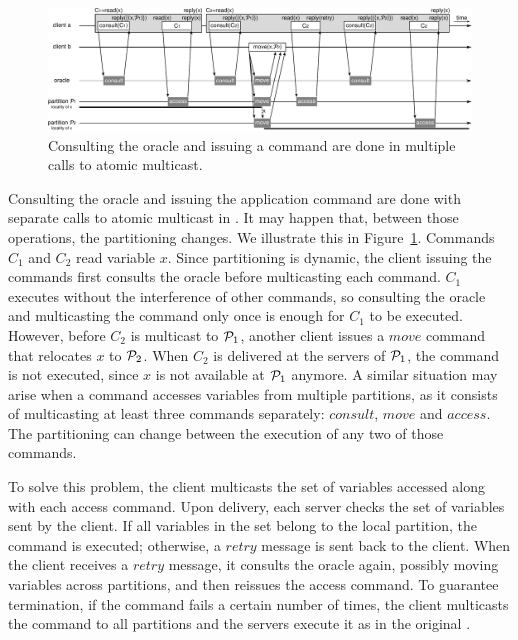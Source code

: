 \begin{figure}
\begin{minipage}[b]{1.0\linewidth}
\centering
      \includegraphics[width=0.8\linewidth]{figures/dssmr-detail}
\end{minipage}
\caption{Consulting the oracle and issuing a command are done in multiple calls to atomic multicast.}
\label{fig:dssmr-detail}
\end{figure}

Consulting the oracle and issuing the application command are done with separate
calls to atomic multicast in \dssmr{}. It may happen that, between those
operations, the partitioning changes. We illustrate this in
Figure~\ref{fig:dssmr-detail}. Commands $C_1$ and $C_2$ read variable $x$. Since
partitioning is dynamic, the client issuing the commands first consults the
oracle before multicasting each command. $C_1$ executes without the interference
of other commands, so consulting the oracle and multicasting the command only
once is enough for $C_1$ to be executed. However, before $C_2$ is multicast to
$\mathcal{P}_1$, another client issues a $move$ command that relocates $x$ to $\mathcal{P}_2$.
When $C_2$ is delivered at the servers of $\mathcal{P}_1$, the command is not executed,
since $x$ is not available at $\mathcal{P}_1$ anymore. A similar situation may arise
when a command accesses variables from multiple partitions, as it consists of
multicasting at least three commands separately: $consult$, $move$ and $access$.
The partitioning can change between the execution of any two of those commands.

To solve this problem, the client multicasts the set of variables accessed along
with each access command. Upon delivery, each server checks the set of variables
sent by the client. If all variables in the set belong to the local partition,
the command is executed; otherwise, a $retry$ message is sent back to the
client. When the client receives a $retry$ message, it consults the oracle
again, possibly moving variables across partitions, and then reissues the access
command. To guarantee termination, if the command fails a certain number of
times, the client multicasts the command to all partitions and the servers
execute it as in the original \ssmr{}.

